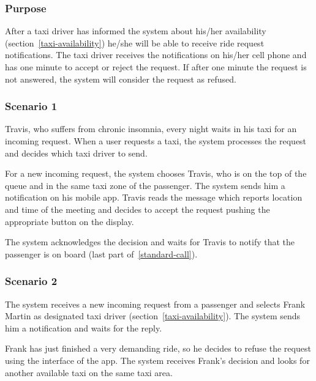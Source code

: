 \label{driver-notification}
\subsubsection{Purpose}

After a taxi driver has informed the system about his/her availability (section~\ref{taxi-availability})
he/she will be able to receive ride request notifications. The taxi driver receives the notifications on his/her cell phone and has one minute to accept or reject the request. If after one minute the request is not answered, the system will consider the request as refused.

\subsubsection{Scenario 1}
Travis, who suffers from chronic insomnia, every night waits in his taxi for an incoming request. When a user requests a taxi, the system processes the request and decides which taxi driver to send.

For a new incoming request, the system chooses Travis, who is on the top of the queue and in the same taxi zone of the passenger. The system sends him a notification on his mobile app. Travis reads the message which reports location and time of the meeting and decides to accept the request pushing the appropriate button on the display.

The system acknowledges the decision and waits for Travis to notify that the passenger is on board (last part of~\ref{standard-call}).

\subsubsection{Scenario 2}
The system receives a new incoming request from a passenger and selects Frank Martin as designated taxi driver (section~\ref{taxi-availability}).
The system sends him a notification and waits for the reply.

Frank has just finished a very demanding ride, so he decides to refuse the request using the interface of the app. The system receives Frank's decision and looks for another available taxi on the same taxi area.

